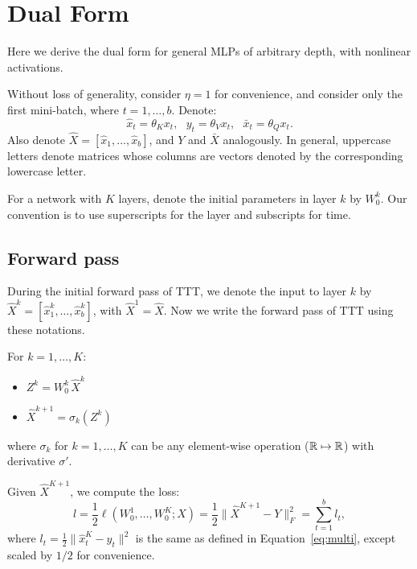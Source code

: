 \documentclass{article}
\begin{document}
\clearpage




\clearpage
\appendix

\section{Dual Form}
\label{app:dual}

Here we derive the dual form for general MLPs of arbitrary depth, with nonlinear activations.

Without loss of generality, consider $\eta = 1$ for convenience, and consider only the first mini-batch, where $t=1,\dots,b$.
Denote:
\vspace{-1ex}
$$
\hat{x}_t = \theta_Kx_t, ~~~
y_t = \theta_Vx_t, ~~~
\bar{x}_t = \theta_Qx_t.
$$
Also denote
$\hat{X} = [\hat{x}_1, \dots, \hat{x}_b]$,
and $Y$ and $\bar{X}$ analogously.
In general, uppercase letters denote matrices whose columns are vectors denoted by the corresponding lowercase letter.

For a network with $K$ layers, denote the initial parameters in layer $k$ by $W_0^k$.
Our convention is to use superscripts for the layer and subscripts for time.

\subsection{Forward pass}
During the initial forward pass of TTT,
we denote the input to layer $k$ by
$\hat{X}^k = [\hat{x}^k_1, \dots, \hat{x}^k_b]$, with $\hat{X}^1 = \hat{X}$.
Now we write the forward pass of TTT using these notations.

For $k = 1,\dots,K$:
\begin{itemize}
    \item $Z^k = W_0^k \, \hat{X}^k$
    \item $\hat{X}^{k+1} = \sigma_k\left(Z^k\right)$
\end{itemize}
where $\sigma_k$ for $k = 1,\dots,K$ can be any element-wise operation ($\mathbb{R}\mapsto\mathbb{R}$) with derivative $\sigma'$.

Given $\hat{X}^{K+1}$, we compute the loss:
\vspace{-1ex}
$$
l = \frac{1}{2}\ell\left(W_0^1,\dots,W_0^K; X\right) = \frac{1}{2}\big\|\hat{X}^{K+1} - Y\big\|_F^2 = \sum_{t=1}^b l_t,
$$
where $l_t = \frac{1}{2}\|\hat{x}^K_t - y_t\|^2$ is the same as defined in Equation~\ref{eq:multi}, except scaled by $1/2$ for convenience.
\end{document}
